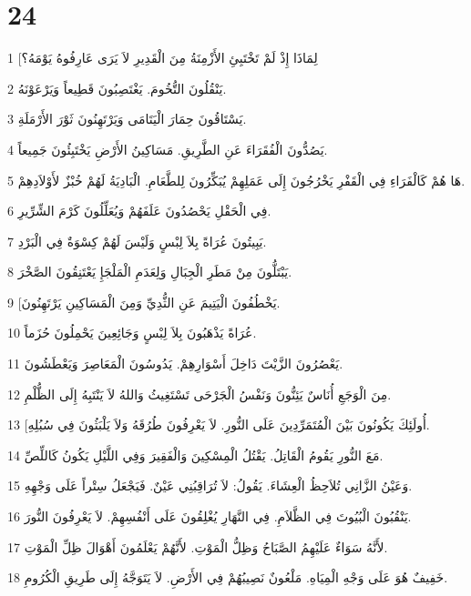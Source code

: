\chapter{24}

\par 1 [لِمَاذَا إِذْ لَمْ تَخْتَبِئِ الأَزْمِنَةُ مِنَ الْقَدِيرِ لاَ يَرَى عَارِفُوهُ يَوْمَهُ؟
\par 2 يَنْقُلُونَ التُّخُومَ. يَغْتَصِبُونَ قَطِيعاً وَيَرْعَوْنَهُ.
\par 3 يَسْتَاقُونَ حِمَارَ الْيَتَامَى وَيَرْتَهِنُونَ ثَوْرَ الأَرْمَلَةِ.
\par 4 يَصُدُّونَ الْفُقَرَاءَ عَنِ الطَّرِيقِ. مَسَاكِينُ الأَرْضِ يَخْتَبِئُونَ جَمِيعاً.
\par 5 هَا هُمْ كَالْفَرَاءِ فِي الْقَفْرِ يَخْرُجُونَ إِلَى عَمَلِهِمْ يُبَكِّرُونَ لِلطَّعَامِ. الْبَادِيَةُ لَهُمْ خُبْزٌ لأَوْلاَدِهِمْ.
\par 6 فِي الْحَقْلِ يَحْصُدُونَ عَلَفَهُمْ وَيُعَلِّلُونَ كَرْمَ الشِّرِّيرِ.
\par 7 يَبِيتُونَ عُرَاةً بِلاَ لِبْسٍ وَلَيْسَ لَهُمْ كِسْوَةٌ فِي الْبَرْدِ.
\par 8 يَبْتَلُّونَ مِنْ مَطَرِ الْجِبَالِ وَلِعَدَمِ الْمَلْجَإِ يَعْتَنِقُونَ الصَّخْرَ.
\par 9 [يَخْطُفُونَ الْيَتِيمَ عَنِ الثُّدِيِّ وَمِنَ الْمَسَاكِينِ يَرْتَهِنُونَ.
\par 10 عُرَاةً يَذْهَبُونَ بِلاَ لِبْسٍ وَجَائِعِينَ يَحْمِلُونَ حُزَماً.
\par 11 يَعْصُرُونَ الزَّيْتَ دَاخِلَ أَسْوَارِهِمْ. يَدُوسُونَ الْمَعَاصِرَ وَيَعْطَشُونَ.
\par 12 مِنَ الْوَجَعِ أُنَاسٌ يَئِنُّونَ وَنَفْسُ الْجَرْحَى تَسْتَغِيثُ وَاللهُ لاَ يَنْتَبِهُ إِلَى الظُّلْمِ.
\par 13 [أُولَئِكَ يَكُونُونَ بَيْنَ الْمُتَمَرِّدِينَ عَلَى النُّورِ. لاَ يَعْرِفُونَ طُرُقَهُ وَلاَ يَلْبَثُونَ فِي سُبُلِهِ.
\par 14 مَعَ النُّورِ يَقُومُ الْقَاتِلُ. يَقْتُلُ الْمِسْكِينَ وَالْفَقِيرَ وَفِي اللَّيْلِ يَكُونُ كَاللِّصِّ.
\par 15 وَعَيْنُ الزَّانِي تُلاَحِظُ الْعِشَاءَ. يَقُولُ: لاَ تُرَاقِبُنِي عَيْنٌ. فَيَجْعَلُ سِتْراً عَلَى وَجْهِهِ.
\par 16 يَنْقُبُونَ الْبُيُوتَ فِي الظَّلاَمِ. فِي النَّهَارِ يُغْلِقُونَ عَلَى أَنْفُسِهِمْ. لاَ يَعْرِفُونَ النُّورَ.
\par 17 لأَنَّهُ سَوَاءٌ عَلَيْهِمُ الصَّبَاحُ وَظِلُّ الْمَوْتِ. لأَنَّهُمْ يَعْلَمُونَ أَهْوَالَ ظِلِّ الْمَوْتِ.
\par 18 خَفِيفٌ هُوَ عَلَى وَجْهِ الْمِيَاهِ. مَلْعُونٌ نَصِيبُهُمْ فِي الأَرْضِ. لاَ يَتَوَجَّهُ إِلَى طَرِيقِ الْكُرُومِ.
